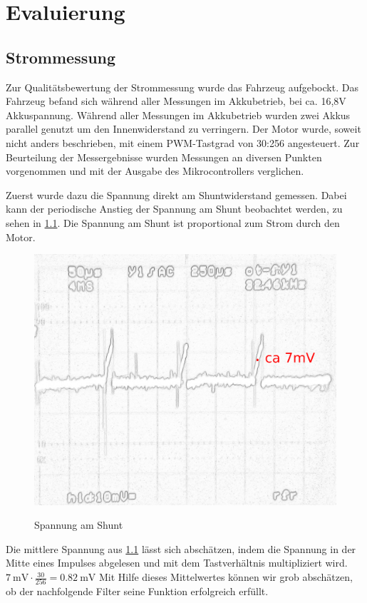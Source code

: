\chapter{Evaluierung}



\section{Strommessung}

Zur Qualitätsbewertung der Strommessung wurde das Fahrzeug aufgebockt. 
Das Fahrzeug befand sich während aller Messungen im Akkubetrieb, bei ca. 16,8V Akkuspannung.
Während aller Messungen im Akkubetrieb wurden zwei Akkus parallel genutzt um den Innenwiderstand zu verringern.
Der Motor wurde, soweit nicht anders beschrieben, mit einem PWM-Tastgrad von 30:256 angesteuert.
Zur Beurteilung der Messergebnisse wurden Messungen an diversen Punkten vorgenommen und mit der Ausgabe des Mikrocontrollers verglichen.

Zuerst wurde dazu die Spannung direkt am Shuntwiderstand gemessen.
Dabei kann der periodische Anstieg der Spannung am Shunt beobachtet werden, zu sehen in \cref{fig:filter_eingang}. Die Spannung am Shunt ist proportional zum Strom durch den Motor.

\begin{figure}[H]
\centering
\includegraphics[width=.8\textwidth]{filter_eingang_mak.png}\\
\caption{Spannung am Shunt}%
\label{fig:filter_eingang}
\end{figure}

Die mittlere Spannung aus \cref{fig:filter_eingang} lässt sich abschätzen, indem die Spannung in der Mitte eines Impulses abgelesen und mit dem Tastverhältnis multipliziert wird.
$\SI{7}{\mV}\cdot\frac{30}{256}=\SI{0,82}{\mV} $
Mit Hilfe dieses Mittelwertes können wir grob abschätzen, ob der nachfolgende Filter seine Funktion erfolgreich erfüllt.


